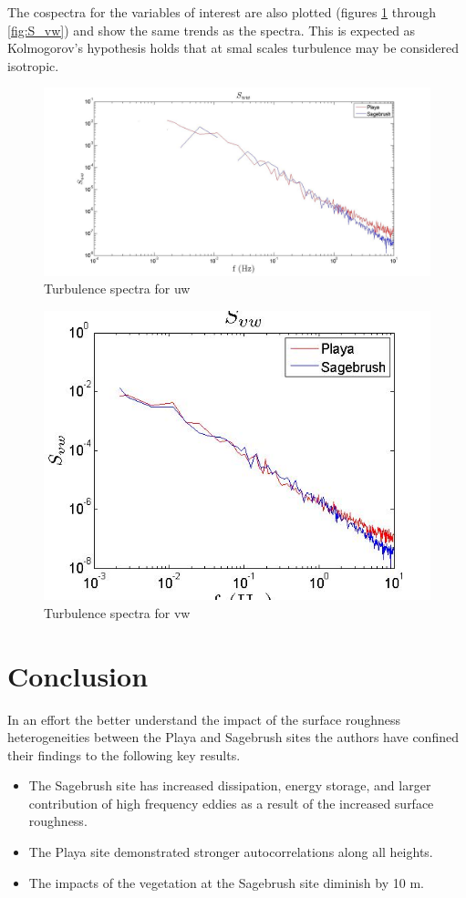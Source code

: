 \documentclass[]{article}
\begin{document}
The cospectra for the variables of interest are also plotted (figures \ref{fig:S_uw10m} through \ref{fig:S_vw}) and show the same trends as the spectra. This is expected as Kolmogorov's hypothesis holds that at smal scales turbulence may be considered isotropic.\cite{Pope}
\begin{figure}[h]
	\centering
	\includegraphics[width=\textwidth]{S_uw10m.jpg}
	\caption{Turbulence spectra for uw}
	\label{fig:S_uw10m}
\end{figure}
\begin{figure}[h]
	\centering
	\includegraphics[width=\textwidth]{S_vw10.jpg}
	\caption{Turbulence spectra for vw}
	\label{fig:S_vw10m}
\end{figure}

\section{Conclusion}
 In an effort the better understand the impact of the surface roughness heterogeneities between the Playa and Sagebrush sites the authors have confined their findings to the following key results. 
 \begin{itemize}
 	\item
 	The Sagebrush site has increased dissipation, energy storage, and larger contribution of high frequency eddies as a result of the increased surface roughness.
 	\item
 	The Playa site demonstrated stronger autocorrelations along all heights.
 	\item 
 	The impacts of the vegetation at the Sagebrush site diminish by 10 m.
 \end{itemize}
 
\end{document}
